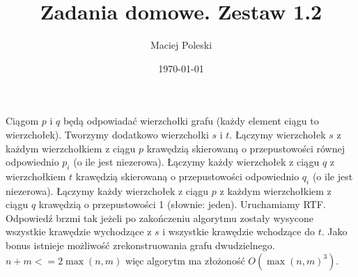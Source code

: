 \documentclass[a4paper,12pt]{article}
\title{Zadania domowe. Zestaw 1.2}
\author{Maciej Poleski}
\date{\today}
\begin{document}
\maketitle

\newpage

\section{}
\section{}
\section{}
Ciągom $p$ i $q$ będą odpowiadać wierzchołki grafu (każdy element ciągu to wierzchołek).
Tworzymy dodatkowo wierzchołki $s$ i $t$. Łączymy wierzchołek $s$ z każdym wierzchołkiem z ciągu $p$ krawędzią skierowaną o przepustowości równej odpowiednio $p_i$ (o ile jest niezerowa). Łączymy każdy wierzchołek z ciągu $q$ z wierzchołkiem $t$ krawędzią skierowaną o przepustowości odpowiednio $q_i$ (o ile jest niezerowa). Łączymy każdy wierzchołek z ciągu $p$ z każdym wierzchołkiem z ciągu $q$ krawędzią o przepustowości 1 (słownie: jeden). Uruchamiamy RTF. Odpowiedź brzmi tak jeżeli po zakończeniu algorytmu zostały wysycone wszystkie krawędzie wychodzące z $s$ i wszystkie krawędzie wchodzące do $t$. Jako bonus istnieje możliwość zrekonstruowania grafu dwudzielnego. $n+m<=2\max(n,m)$ więc algorytm ma złożoność $O(\max(n,m)^3)$.
\end{document}

